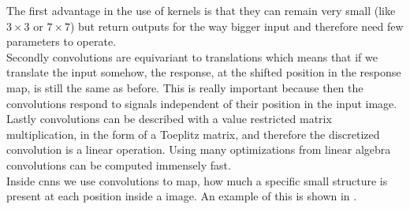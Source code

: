The first advantage in the use of kernels is that they can remain very small (like $3\times 3$ or $7\times 7$) but return outputs for the way bigger input and therefore need few parameters to operate.\\
Secondly convolutions are equivariant to translations which means that if we translate the input somehow, the response, at the shifted position in the response map, is still the same as before. This is really important because then the convolutions respond to signals independent of their position in the input image.\\
Lastly convolutions can be described with a value restricted matrix multiplication, in the form of a Toeplitz matrix, and therefore the discretized convolution is a linear operation. Using many optimizations from linear algebra convolutions can be computed immensely fast.\\
Inside \glspl{cnn} we use convolutions to map, how much a specific small structure is present at each position inside a image. An example of this is shown in .


